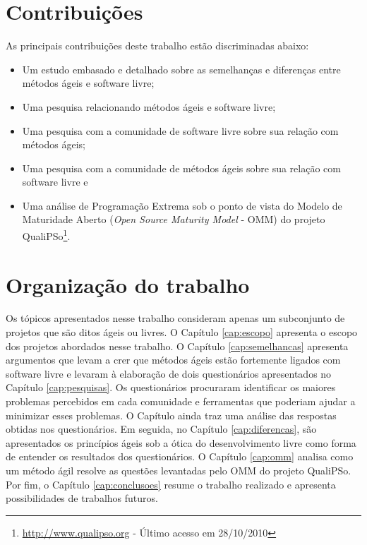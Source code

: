 \section{Contribuições}
\label{sec:contribucoes}

As principais contribuições deste trabalho estão discriminadas abaixo:

\begin{itemize}
\item Um estudo embasado e detalhado sobre as semelhanças e diferenças
  entre métodos ágeis e software livre;
\item Uma pesquisa relacionando métodos ágeis e software livre;
\item Uma pesquisa com a comunidade de software livre sobre sua
  relação com métodos ágeis;
\item Uma pesquisa com a comunidade de métodos ágeis sobre sua relação
  com software livre e
\item Uma análise de Programação Extrema \cite{XP01} sob o ponto de
  vista do Modelo de Maturidade Aberto (\emph{Open Source Maturity
    Model} - OMM) do projeto
  QualiPSo\footnote{\url{http://www.qualipso.org} - Último acesso em
    28/10/2010}.
\end{itemize}

\section{Organização do trabalho}
\label{sec:organizacao_trabalho}

Os tópicos apresentados nesse trabalho consideram apenas um
subconjunto de projetos que são ditos ágeis ou livres. O Capítulo
\ref{cap:escopo} apresenta o escopo dos projetos abordados nesse
trabalho. O Capítulo \ref{cap:semelhancas} apresenta argumentos que
levam a crer que métodos ágeis estão fortemente ligados com software
livre e levaram à elaboração de dois questionários apresentados no
Capítulo \ref{cap:pesquisas}. Os questionários procuraram identificar
os maiores problemas percebidos em cada comunidade e ferramentas que
poderiam ajudar a minimizar esses problemas. O Capítulo ainda traz uma
análise das respostas obtidas nos questionários.  Em seguida, no
Capítulo \ref{cap:diferencas}, são apresentados os princípios ágeis
sob a ótica do desenvolvimento livre como forma de entender os
resultados dos questionários. O Capítulo \ref{cap:omm} analisa como um
método ágil resolve as questões levantadas pelo OMM do projeto
QualiPSo.  Por fim, o Capítulo \ref{cap:conclusoes} resume o trabalho
realizado e apresenta possibilidades de trabalhos futuros.

